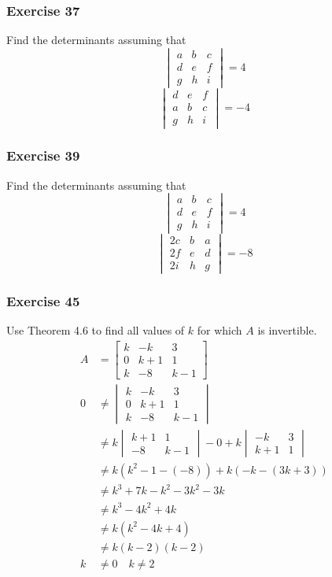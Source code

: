 \documentclass{math}
\begin{document}
\subsubsection*{Exercise 37}
Find the determinants assuming that
\[ \begin{vmatrix}
  a & b & c \\
  d & e & f \\
  g & h & i
\end{vmatrix} = 4 \]
\[ \begin{vmatrix}
  d & e & f \\
  a & b & c \\
  g & h & i
\end{vmatrix} = -4 \]

\subsubsection*{Exercise 39}
Find the determinants assuming that
\[ \begin{vmatrix}
  a & b & c \\
  d & e & f \\
  g & h & i
\end{vmatrix} = 4 \]
\[ \begin{vmatrix}
  2c & b & a \\
  2f & e & d \\
  2i & h & g
\end{vmatrix} = -8 \]

\subsubsection*{Exercise 45}
Use Theorem 4.6 to find all values of \( k \) for which \( A \) is invertible.
\begin{align*}
  A &= \begin{bmatrix}
    k & -k & 3 \\
    0 & k+1 & 1 \\
    k & -8 & k-1
  \end{bmatrix} \\
  0 &\ne \begin{vmatrix}
    k & -k & 3 \\
    0 & k+1 & 1 \\
    k & -8 & k-1
  \end{vmatrix} \\
  &\ne k\begin{vmatrix}k+1 & 1 \\ -8 & k-1\end{vmatrix}-0+
    k\begin{vmatrix}-k & 3 \\ k+1 & 1\end{vmatrix} \\
  &\ne k(k^2-1-(-8))+k(-k-(3k+3)) \\
  &\ne k^3+7k-k^2-3k^2-3k \\
  &\ne k^3-4k^2+4k \\
  &\ne k(k^2-4k+4) \\
  &\ne k(k-2)(k-2) \\
  k &\ne 0 \quad k\ne2
\end{align*}
\end{document}

